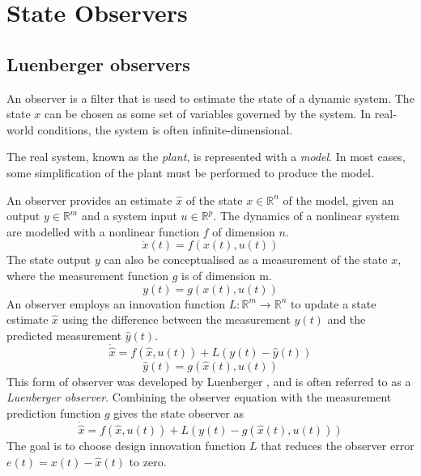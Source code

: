 \section{State Observers} \label{sec:observerequations}
\subsection{Luenberger observers}
An observer is a filter that is used to estimate the state of a dynamic system. The state $x$ can be chosen as some set of variables governed by the system. In real-world conditions, the system is often infinite-dimensional.

The real system, known as the \textit{plant}, is represented with a \textit{model}. In most cases, some simplification of the plant must be performed to produce the model.

An observer provides an estimate $\hat{x}$ of the state $x \in \mathbb{R}^n$ of the model, given an output $y \in \mathbb{R}^m$ and a system input $u \in \mathbb{R}^p$. The dynamics of a nonlinear system are modelled with a nonlinear function $f$ of dimension $n$.
\begin{equation}
	\dot{x}(t) = f(x(t),u(t))
\end{equation}
The state output $y$ can also be conceptualised as a measurement of the state $x$, where the measurement function $g$ is of dimension m.
\begin{equation}
	y(t) = g(x(t),u(t))
\end{equation}
An observer employs an innovation function $L: \mathbb{R}^m \rightarrow \mathbb{R}^n$ to update a state estimate $\hat{x}$ using the difference between the measurement $y(t)$ and the predicted measurement $\hat{y}(t)$.
\begin{equation} \label{eq:observerfunction}
	\dot{\hat{x}} = f(\hat{x},u(t)) + L(y(t)-\hat{y}(t))
\end{equation}
\begin{equation}
	\hat{y}(t) = g(\hat{x}(t),u(t)) 
\end{equation}
This form of observer was developed by Luenberger \cite{luenberger1966observers}, and is often referred to as a \textit{Luenberger observer}. Combining the observer equation with the measurement prediction function $g$ gives the state observer as
\begin{equation}
	\dot{\hat{x}} = f(\hat{x},u(t)) + L(y(t)-g(\hat{x}(t),u(t)))
\end{equation}
The goal is to choose design innovation function $L$ that reduces the observer error $e(t) = x(t) - \hat{x}(t)$ to zero.

